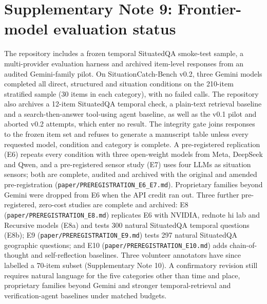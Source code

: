 \documentclass[Numbered]{sn-jnl}
\begin{document}
\section*{Supplementary Note 9: Frontier-model evaluation status}
The repository includes a frozen temporal SituatedQA smoke-test sample, a
multi-provider evaluation harness and archived item-level responses from an
audited Gemini-family pilot. On SituationCatch-Bench v0.2, three Gemini models
completed all direct, structured and situation conditions on the 210-item
stratified sample (30 items in each category), with no failed calls. The
repository also archives a 12-item SituatedQA temporal check, a plain-text
retrieval baseline and a search-then-answer tool-using agent baseline, as well
as the v0.1 pilot and aborted v0.2 attempts, which enter no result. The integrity gate joins responses to the frozen item set and refuses
to generate a manuscript table unless every requested model, condition and
category is complete. A pre-registered replication (E6) repeats every
condition with three open-weight models from Meta, DeepSeek and Qwen, and a
pre-registered sensor study (E7) uses four LLMs as situation sensors; both are
complete, audited and archived with the original and amended pre-registration
(\texttt{paper/PREREGISTRATION\_E6\_E7.md}). Proprietary families beyond Gemini
were dropped from E6 when the API credit ran out. Three further pre-registered,
zero-cost studies are complete and archived: E8 (\texttt{paper/PREREGISTRATION\_E8.md})
replicates E6 with NVIDIA, rednote hi lab and Recursive models (E8a) and tests 300
natural SituatedQA temporal questions (E8b); E9 (\texttt{paper/PREREGISTRATION\_E9.md})
tests 297 natural SituatedQA geographic questions; and E10
(\texttt{paper/PREREGISTRATION\_E10.md}) adds chain-of-thought and self-reflection
baselines. Three volunteer annotators have since labelled a 70-item subset (Supplementary
Note 10). A confirmatory revision still requires natural language for the five
categories other than time and place, proprietary families beyond Gemini and
stronger temporal-retrieval and verification-agent baselines under matched budgets.
\end{document}
